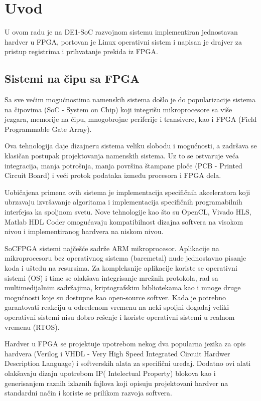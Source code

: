 \section{Uvod}
U ovom radu je na DE1-SoC razvojnom sistemu implementiran jednostavan hardver u FPGA, portovan je Linux operativni sistem i napisan je drajver za pristup registrima i prihvatanje prekida iz FPGA. 

\subsection{Sistemi na čipu sa FPGA}
Sa sve većim mogućnostima namenskih sistema došlo je do popularizacije sistema na čipovima (SoC - System on Chip) koji integrišu mikroprocesore sa više jezgara, memorije na čipu, mnogobrojne periferije i transivere, kao i FPGA (Field Programmable Gate Array).

Ova tehnologija daje dizajneru sistema veliku slobodu i mogućnosti, a zadršava se klasičan postupak projektovanja namenskih sistema. Uz to se ostvaruje veća integracija, manja potrošnja, manja površina štampane ploče (PCB - Printed Circuit Board) i veći protok podataka između procesora i FPGA dela. 

Uobičajena primena ovih sistema je implementacija specifičnih akceleratora koji ubrzavaju izvršavanje algoritama i implementacija specifičnih programabilnih interfejsa ka spoljnom svetu. Nove tehnologije kao što su OpenCL, Vivado HLS, Matlab HDL Coder omogućavaju kompatibilnost dizajna softvera na visokom nivou i implementiranog hardvera na niskom nivou.

SoCFPGA sistemi najčešće sadrže ARM mikroprocesor. Aplikacije na mikroprocesoru bez operativnog sistema (baremetal) nude jednostavno pisanje koda i uštedu na resursima. Za kompleksnije aplikacije koriste se operativni sistemi (OS) i time se olakšava integrisanje mrežnih protokola, rad sa multimedijalnim sadržajima, kriptografskim bibliotekama kao i mnoge druge mogućnosti koje su dostupne kao open-source softver. Kada je potrebno garantovati reakciju u određenom vremenu na neki spoljni događaj veliki operativni sistemi nisu dobro rešenje i koriste operativni sistemi u realnom vremenu (RTOS).

Hardver u FPGA se projektuje upotrebom nekog dva popularna jezika za opis hardvera (Verilog i VHDL - Very High Speed Integrated Circuit Hardwer Description Language) i softverskih alata za specifični uređaj. Dodatno ovi alati olakšavaju dizajn upotrebom IP( Intelectual Property) blokova kao i generisanjem raznih izlaznih fajlova koji opisuju projektovani hardver na standardni način i koriste se prilikom razvoja softvera.

